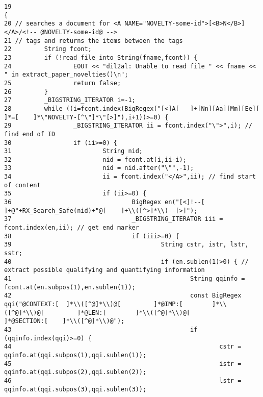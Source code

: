 \footnotesize\begin{verbatim}19                                                                                 {
20 // searches a document for <A NAME="NOVELTY-some-id">[<B>N</B>]</A>/<!-- @NOVELTY-some-id@ -->
21 // tags and returns the items between the tags
22         String fcont;
23         if (!read_file_into_String(fname,fcont)) {
24                 EOUT << "dil2al: Unable to read file " << fname << " in extract_paper_novelties()\n";
25                 return false;
26         }
27         _BIGSTRING_ITERATOR i=-1;
28         while ((i=fcont.index(BigRegex("[<]A[   ]+[Nn][Aa][Mm][Ee][     ]*=[    ]*\"NOVELTY-[^\"]*\"[>]"),i+1))>=0) {
29                 _BIGSTRING_ITERATOR ii = fcont.index("\">",i); // find end of ID
30                 if (ii>=0) {
31                         String nid;
32                         nid = fcont.at(i,ii-i);
33                         nid = nid.after("\"",-1);
34                         ii = fcont.index("</A>",ii); // find start of content
35                         if (ii>=0) {
36                                 BigRegex en("[<]!--[    ]+@"+RX_Search_Safe(nid)+"@[    ]+\\([^>]*\\)--[>]");
37                                 _BIGSTRING_ITERATOR iii = fcont.index(en,ii); // get end marker
38                                 if (iii>=0) {
39                                         String cstr, istr, lstr, sstr;
40                                         if (en.sublen(1)>0) { // extract possible qualifying and quantifying information
41                                                 String qqinfo = fcont.at(en.subpos(1),en.sublen(1));
42                                                 const BigRegex qqi("@CONTEXT:[  ]*\\([^@]*\\)@[         ]*@IMP:[        ]*\\([^@]*\\)@[         ]*@LEN:[        ]*\\([^@]*\\)@[         ]*@SECTION:[    ]*\\([^@]*\\)@");
43                                                 if (qqinfo.index(qqi)>=0) {
44                                                         cstr = qqinfo.at(qqi.subpos(1),qqi.sublen(1));
45                                                         istr = qqinfo.at(qqi.subpos(2),qqi.sublen(2));
46                                                         lstr = qqinfo.at(qqi.subpos(3),qqi.sublen(3));

\end{verbatim}
